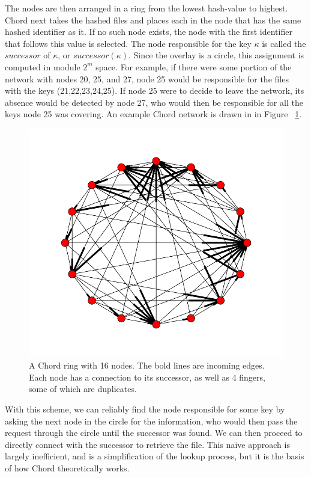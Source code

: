 \documentclass[10pt, conference, compsocconf]{IEEEtran}
\begin{document}
The nodes are then arranged in a ring from the lowest hash-value to highest.  Chord next takes the hashed files and places each in the node that has the same hashed identifier as it.  If no such node exists, the node with the first identifier that follows this value is selected.  The node responsible for the key $\kappa$ is called the $successor$ of $\kappa$, or $successor(\kappa)$.  Since the overlay is a circle, this assignment is computed in module $2^m$ space.  For example, if there were some portion of the network with nodes 20, 25, and 27, node 25 would be responsible for the files with the keys (21,22,23,24,25). If node 25 were to decide to leave the network, its absence would be detected by node 27, who would then be responsible for all the keys node 25 was covering. An example Chord network is drawn in in Figure ~\ref{chordreal}.
\begin{figure}
    \includegraphics[width=\linewidth]{chordreal}
    \caption{A Chord ring with 16 nodes.  The bold lines are incoming edges.  Each node has a connection to its successor, as well as 4 fingers, some of which are duplicates.}
    \label{chordreal}
\end{figure}


With this scheme, we can reliably find the node responsible for some key by asking the next node in the circle for the information, who would then pass the request through the circle until the successor was found.  We can then proceed to directly connect with the successor to retrieve the file.  This naive approach is largely inefficient, and is a simplification of the lookup process, but it is the basis of how Chord theoretically works.
\end{document}
